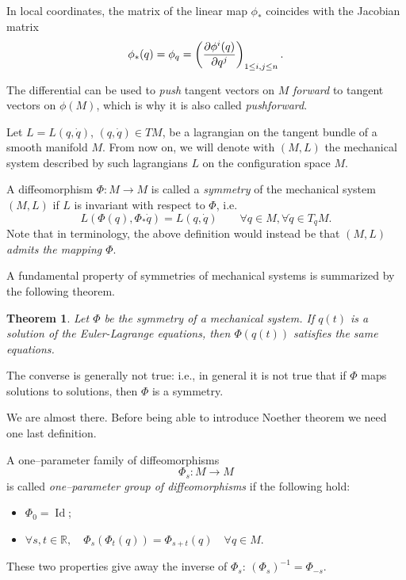 \documentclass[english,fontsize=11pt,paper=a5,oneside]{scrbook}
\newcommand{\R}{\mathbb{R}}
\let\d\relax
\newcommand{\d}{\mathrm{d}}
\DeclareMathOperator{\Id}{Id}
\newtheorem{theorem}{Theorem}[chapter]
\theoremstyle{definition}
\begin{document}
In local coordinates, the matrix of the linear map $\phi_*$ coincides with the Jacobian matrix
\begin{equation}
  \phi_*(q) = \d \phi_q = \left(\frac{\partial \phi^i(q)}{\partial q^j}\right)_{1\leq i,j\leq n}.
\end{equation}

The differential can be used to \emph{push} tangent vectors on $M$ \emph{forward} to tangent vectors on $\phi(M)$, which is why it is also called \emph{pushforward}.

\begin{tcolorbox}
  Let $L = L(q, \dot q)$, $(q, \dot q)\in TM$, be a lagrangian on the tangent bundle of a smooth manifold $M$. From now on, we will denote with $(M, L)$ the mechanical system described by such lagrangians $L$ on the configuration space $M$.
\end{tcolorbox}

A diffeomorphism $\Phi: M \to M$ is called a \emph{symmetry} of the mechanical system $(M,L)$ if $L$ is invariant with respect to $\Phi$, i.e.
\begin{equation}\label{eq:symmetry}
  L\left(\Phi(q), \Phi_*\dot q\right) = L(q,\dot q) \qquad \forall q\in M, \forall\dot q \in T_q M.
\end{equation}
Note that in \cite[Chapter 4]{book:arnold} terminology, the above definition would instead be that \emph{$(M,L)$ admits the mapping $\Phi$}.

A fundamental property of symmetries of mechanical systems is summarized by the following theorem.

\begin{theorem}
  Let $\Phi$ be the symmetry of a mechanical system. If $q(t)$ is a solution of the Euler-Lagrange equations, then $\Phi(q(t))$ satisfies the same equations.
\end{theorem}

The converse is generally not true: i.e., in general it is not true that if $\Phi$ maps solutions to solutions, then $\Phi$ is a symmetry.

We are almost there.
Before being able to introduce Noether theorem we need one last definition.

A one--parameter family of diffeomorphisms
\begin{equation}
  \Phi_s : M \to M
\end{equation}
is called \emph{one--parameter group of diffeomorphisms} if the following hold:
\begin{itemize}
  \item $\Phi_0 = \Id$;
  \item $\forall s, t \in \R, \quad \Phi_s(\Phi_t(q)) = \Phi_{s+t}(q)\quad \forall q\in M$.
\end{itemize}
These two properties give away the inverse of $\Phi_s$: $(\Phi_s)^{-1} = \Phi_{-s}$.
\end{document}
